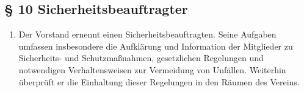 \documentclass[10pt,a4paper]{article}
\begin{document}
\subsection*{§ 10 Sicherheitsbeauftragter}
\begin{enumerate}
\item Der Vorstand ernennt einen Sicherheitsbeauftragten. Seine Aufgaben
	umfassen insbesondere die Aufklärung und Information der Mitglieder
	zu Sicherheits- und Schutzmaßnahmen, gesetzlichen Regelungen und
	notwendigen Verhaltensweisen zur Vermeidung von Unfällen. Weiterhin
	überprüft er die Einhaltung dieser Regelungen in den Räumen des
	Vereins.
\end{enumerate}
\end{document}
